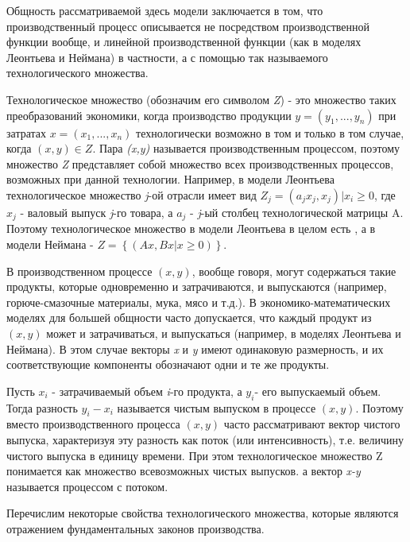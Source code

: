 \documentclass[12pt, 4paper]{book}
\begin{document}
{Общность рассматриваемой здесь модели заключается в том, что производственный процесс описывается не посредством производственной функции вообще, и линейной производственной функции (как в моделях Леонтьева и Неймана) в частности, а с помощью так называемого технологического множества.
\par

Технологическое множество (обозначим его символом \textit{Z}) - это множество таких преобразований экономики, когда производство продукции $y=(y_1,...,y_n)$ при затратах $x=(x_1,...,x_n)$ технологически возможно в том и только в том случае, когда $(x,y) \in Z$. Пара \textit{(x,y)} называется производственным процессом, поэтому множество \textit{Z} представляет собой множество всех производственных процессов, возможных при данной технологии. Например, в модели Леонтьева технологическое множество \textit{j}-ой отрасли имеет вид $Z_j = {(a_j x_j , x_j)| x_i \geq 0}$, где $x_j$ - валовый выпуск \textit{j}-го товара, а $a_j$ - \textit{j}-ый столбец технологической матрицы A. Поэтому технологическое множество в модели Леонтьева в целом есть , а в модели Неймана - $Z=\left\{(Ax,Bx|x \geq 0)\right\}$.
\par

В производственном процессе  $(x,y)$, вообще говоря, могут содержаться такие продукты, которые одновременно и затрачиваются, и выпускаются (например, горюче-смазочные материалы, мука, мясо и т.д.). В экономико-математических моделях для большей общности часто допускается, что каждый продукт из $(x,y)$ может и затрачиваться, и выпускаться (например, в моделях Леонтьева и Неймана). В этом случае векторы \textit{x} и \textit{y} имеют одинаковую размерность, и их соответствующие компоненты обозначают одни и те же продукты.
\par

Пусть $x_i$ - затрачиваемый объем \textit{i}-го продукта, а $y_i$- его выпускаемый объем. Тогда разность $y_i - x_i$ называется чистым выпуском в процессе $(x,y)$. Поэтому вместо производственного процесса $(x,y)$ часто рассматривают вектор чистого выпуска, характеризуя эту разность как поток (или интенсивность), т.е. величину чистого выпуска в единицу времени. При этом технологическое множество Z понимается как множество всевозможных чистых выпусков. а вектор \textit{x-y} называется процессом с потоком.
\par

Перечислим некоторые свойства технологического множества, которые являются отражением фундаментальных законов производства.
\par

}
\end{document}
